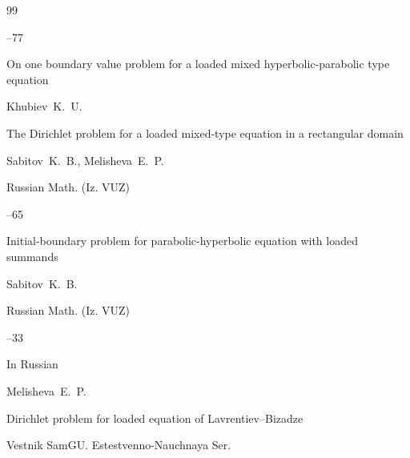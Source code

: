 \begin{thebibliography}{99}



--77

\paper On one boundary value problem for a loaded  mixed hyperbolic-parabolic type equation 

\by Khubiev~K.~U.










\paper The Dirichlet problem for a loaded mixed-type equation in a rectangular domain

\by Sabitov~K.~B., Melisheva~E.~P.

\jour Russian Math. (Iz. VUZ)




--65






\paper Initial-boundary problem for parabolic-hyperbolic equation with loaded summands

\by Sabitov~K.~B.

\jour Russian Math. (Iz. VUZ)




--33








\lang In Russian

\by Melisheva~E.~P.

\paper Dirichlet problem for loaded equation of Lavrentiev--Bizadze

\jour Vestnik SamGU. Estestvenno-Nauchnaya Ser.



\end{thebibliography}
